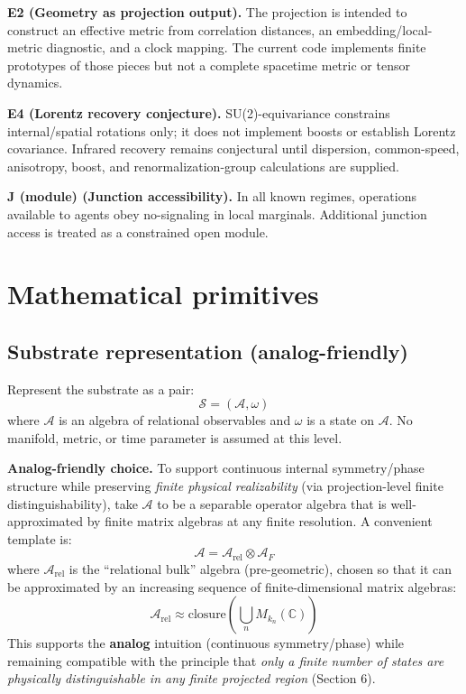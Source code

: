 \documentclass[reprint, amsmath, amssymb, aps, prd]{revtex4-2}
\begin{document}
\textbf{E2 (Geometry as projection output).} The projection is intended to construct an effective metric from correlation distances, an embedding/local-metric diagnostic, and a clock mapping. The current code implements finite prototypes of those pieces but not a complete spacetime metric or tensor dynamics.

\textbf{E4 (Lorentz recovery conjecture).} SU(2)-equivariance constrains internal/spatial rotations only; it does not implement boosts or establish Lorentz covariance. Infrared recovery remains conjectural until dispersion, common-speed, anisotropy, boost, and renormalization-group calculations are supplied.

\textbf{J (module) (Junction accessibility).} In all known regimes, operations available to agents obey no-signaling in local marginals. Additional junction access is treated as a constrained open module.

\section{Mathematical primitives}

\subsection{Substrate representation (analog-friendly)}
Represent the substrate as a pair:
\begin{equation}
\mathcal{S} = (\mathcal{A}, \omega)
\end{equation}
where $\mathcal{A}$ is an algebra of relational observables and $\omega$ is a state on $\mathcal{A}$. No manifold, metric, or time parameter is assumed at this level.

\textbf{Analog-friendly choice.} To support continuous internal symmetry/phase structure while preserving \textit{finite physical realizability} (via projection-level finite distinguishability), take $\mathcal{A}$ to be a separable operator algebra that is well-approximated by finite matrix algebras at any finite resolution. A convenient template is:
\begin{equation}
\mathcal{A} = \mathcal{A}_{\text{rel}} \otimes \mathcal{A}_F
\end{equation}
where $\mathcal{A}_{\text{rel}}$ is the ``relational bulk'' algebra (pre-geometric), chosen so that it can be approximated by an increasing sequence of finite-dimensional matrix algebras:
\begin{equation}
\mathcal{A}_{\text{rel}} \approx \text{closure}\left( \bigcup_n M_{k_n}(\mathbb{C}) \right)
\end{equation}
This supports the \textbf{analog} intuition (continuous symmetry/phase) while remaining compatible with the principle that \textit{only a finite number of states are physically distinguishable in any finite projected region} (Section 6).
\end{document}
